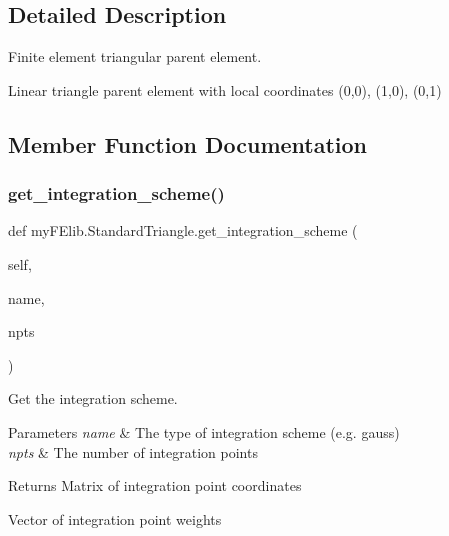 \subsection{Detailed Description}
Finite element triangular parent element. 

Linear triangle parent element with local coordinates (0,0), (1,0), (0,1) 

\subsection{Member Function Documentation}
\mbox{\label{classmyFElib_1_1StandardTriangle_ac825bfb18ff9df609d79746ce27f7535}} 
\subsubsection{\texorpdfstring{get\+\_\+integration\+\_\+scheme()}{get\_integration\_scheme()}}
{\footnotesize\ttfamily def my\+F\+Elib.\+Standard\+Triangle.\+get\+\_\+integration\+\_\+scheme (\begin{DoxyParamCaption}\item[{}]{self,  }\item[{}]{name,  }\item[{}]{npts }\end{DoxyParamCaption})}



Get the integration scheme. 


\begin{DoxyParams}{Parameters}
{\em name} & The type of integration scheme (e.\+g. \textquotesingle{}gauss\textquotesingle{}) \\
\hline
{\em npts} & The number of integration points \\
\hline
\end{DoxyParams}
\begin{DoxyReturn}{Returns}
Matrix of integration point coordinates 

Vector of integration point weights 
\end{DoxyReturn}
\mbox{\label{classmyFElib_1_1StandardTriangle_a374be169ec06f9e1ea1ce6664275e9f6}} 
